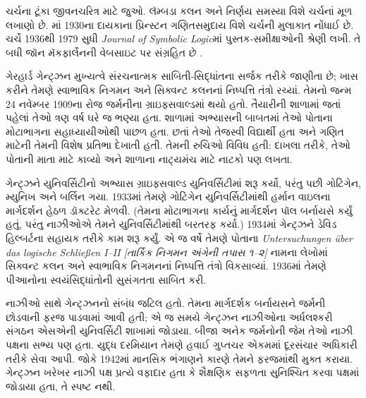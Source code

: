 \begin{reading}
ચર્ચના ટૂંકા જીવનચરિત્ર માટે
\citet{EndertonND} જુઓ. લૅમ્બડા કલન
અને નિર્ણય સમસ્યા
વિશે ચર્ચનાં મૂળ લખાણો
\citet{Church1936,Church1936a} છે.
\citet{Aspray1984}માં 1930ના દાયકાના
પ્રિન્સ્ટન ગણિતસમુદાય વિશે ચર્ચની
મુલાકાત નોંધાઈ છે. ચર્ચે 1936થી
1979 સુધી \emph{Journal of
Symbolic Logic}માં પુસ્તક-સમીક્ષાઓની
શ્રેણી લખી. તે બધી જૉન મૅકફાર્લેનની
વેબસાઇટ પર સંગ્રહિત છે
\citep{MacFarlane2015}.
\end{reading}
\endgroup


\begingroup
\makeatletter{}\makeatother


\label{guunit:OLP-0624}



ગેરહાર્ડ ગેન્ટ્ઝન મુખ્યત્વે સંરચનાત્મક સાબિતી-સિદ્ધાંતના
સર્જક તરીકે જાણીતા છે; ખાસ કરીને તેમણે સ્વાભાવિક નિગમન
અને સિક્વન્ટ કલનનાં નિષ્પત્તિ તંત્રો રચ્યાં.
તેમનો જન્મ 24 નવેમ્બર 1909ના રોજ જર્મનીના
ગ્રાઇફ્સવાલ્ડમાં થયો હતો. તૈયારીની શાળામાં જતાં પહેલાં
તેઓ ત્રણ વર્ષ ઘરે જ ભણ્યા હતા. શાળામાં અભ્યાસની બાબતમાં
તેઓ પોતાના મોટાભાગના સહાધ્યાયીઓથી પાછળ હતા.
છતાં તેઓ તેજસ્વી વિદ્યાર્થી હતા અને ગણિત માટેની
તેમની વિશેષ પ્રતિભા દેખાતી હતી. તેમની રુચિઓ વિવિધ
હતી: દાખલા તરીકે, તેઓ પોતાની માતા માટે કાવ્યો
અને શાળાના નાટ્યમંચ માટે નાટકો પણ લખતા.

ગેન્ટ્ઝને યુનિવર્સિટીનો અભ્યાસ ગ્રાઇફ્સવાલ્ડ
યુનિવર્સિટીમાં શરૂ કર્યો, પરંતુ પછી ગોટિંગેન,
મ્યુનિખ અને બર્લિન ગયા. 1933માં તેમણે ગોટિંગેન
યુનિવર્સિટીમાંથી હર્માન વાઇલના માર્ગદર્શન હેઠળ
ડૉક્ટરેટ મેળવી. (તેમના મોટાભાગના કાર્યનું
માર્ગદર્શન પૉલ બર્નાયસે કર્યું હતું, પરંતુ
નાઝીઓએ તેમને યુનિવર્સિટીમાંથી બરતરફ કર્યા.)
1934માં ગેન્ટ્ઝને ડેવિડ હિલ્બર્ટના સહાયક તરીકે
કામ શરૂ કર્યું. એ જ વર્ષે તેમણે પોતાના
\emph{Untersuchungen \"{u}ber das logische Schlie\ss en I--II
  [તાર્કિક નિગમન અંગેની તપાસ ૧--૨]} નામના
લેખોમાં સિક્વન્ટ કલન અને સ્વાભાવિક નિગમનનાં
નિષ્પત્તિ તંત્રો વિકસાવ્યાં. 1936માં
તેમણે પીઆનોના સ્વયંસિદ્ધાંતોની સુસંગતતા સાબિત કરી.

નાઝીઓ સાથે ગેન્ટ્ઝનનો સંબંધ જટિલ હતો.
તેમના માર્ગદર્શક બર્નાયસને જર્મની છોડવાની
ફરજ પાડવામાં આવી હતી; એ જ સમયે ગેન્ટ્ઝન
નાઝીઓના અર્ધલશ્કરી સંગઠન એસએની યુનિવર્સિટી
શાખામાં જોડાયા. બીજા અનેક જર્મનોની જેમ
તેઓ નાઝી પક્ષના સભ્ય પણ હતા. યુદ્ધ દરમિયાન
તેમણે હવાઈ ગુપ્તચર એકમમાં દૂરસંચાર અધિકારી
તરીકે સેવા આપી. જોકે 1942માં માનસિક ભંગાણને
કારણે તેમને ફરજમાંથી મુક્ત કરાયા. ગેન્ટ્ઝન
ખરેખર નાઝી પક્ષ પ્રત્યે વફાદાર હતા કે
શૈક્ષણિક સફળતા સુનિશ્ચિત કરવા પક્ષમાં
જોડાયા હતા, તે સ્પષ્ટ નથી.

